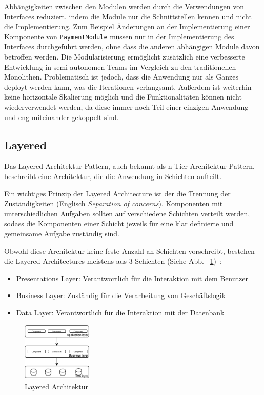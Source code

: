 \documentclass[acmtog]{acmart}
\begin{document}
Abhängigkeiten zwischen den Modulen werden durch die Verwendungen von Interfaces
reduziert, indem die Module nur die Schnittstellen kennen und nicht die Implementierung.
Zum Beispiel Änderungen an der Implementierung einer Komponente von \texttt{PaymentModule} müssen nur
in der Implementierung des Interfaces durchgeführt werden, ohne dass die anderen
abhängigen Module davon betroffen werden.
Die Modularisierung ermöglicht zusätzlich eine verbesserte Entwicklung in semi-autonomen Teams im
Vergleich zu den traditionellen Monolithen.
Problematisch ist jedoch, dass die Anwendung nur als Ganzes deployt werden kann, was
die Iterationen verlangsamt.
Außerdem ist weiterhin keine horizontale Skalierung möglich und die Funktionalitäten
können nicht wiederverwendet werden, da diese immer noch Teil einer einzigen Anwendung
und eng miteinander gekoppelt sind.

\subsection{Layered}
Das Layered Architektur-Pattern, auch bekannt als n-Tier-Architektur-Pattern, beschreibt eine
Architektur, die die Anwendung in Schichten aufteilt.

Ein wichtiges Prinzip der Layered Architecture ist der die Trennung der Zuständigkeiten
(Englisch \textit{Separation of concerns}). Komponenten mit unterschiedlichen Aufgaben sollten
auf verschiedene Schichten verteilt werden, sodass die Komponenten einer Schicht jeweils für
eine klar definierte und gemeinsame Aufgabe zuständig sind. \cite[34]{layered2}

Obwohl diese Architektur keine feste Anzahl an Schichten vorschreibt,
bestehen die Layered Architectures meistens aus 3 Schichten (Siehe Abb. ~\ref{fig:layered})~\cite [3]{layered2}:
\begin{itemize}
\item Presentations Layer: Verantwortlich für die Interaktion mit dem Benutzer
\item Business Layer: Zuständig für die Verarbeitung von Geschäftslogik
\item Data Layer: Verantwortlich für die Interaktion mit der Datenbank
\end{itemize}

\begin{figure}[h!]
    \centering
    \includegraphics[width=0.3\textwidth]{images/layered/Layer}
    \caption{Layered Architektur}
    \label{fig:layered}
\end{figure}
\end{document}
